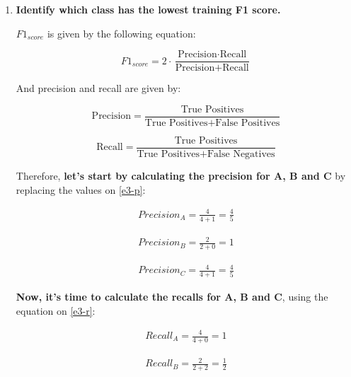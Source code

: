 \documentclass[12pt]{article}
\begin{document}
\begin{enumerate}[leftmargin=\labelsep]
    \item \textbf{Identify which class has the lowest training F1 score.}

    \vskip 0.3cm

    \(F1_{score}\) is given by the following equation:

    \begin{equation}\label{ex3-f1}
        F1_{score} = 2 \cdot \frac{{\text{Precision} \cdot \text{Recall}}}{{\text{Precision} + \text{Recall}}}
    \end{equation}

    And precision and recall are given by:

    \begin{equation}\label{e3-p}
        \text{Precision} = \frac{\text{True Positives}}{{\text{True Positives} + \text{False Positives}}}
    \end{equation}

    \begin{equation}\label{e3-r}
        \text{Recall} = \frac{\text{True Positives}}{{\text{True Positives} + \text{False Negatives}}}
    \end{equation}

    Therefore, \textbf{let's start by calculating the precision for A, B and C} by replacing the values on \eqref{e3-p}:

    \[
        \begin{aligned}
            Precision_A = \frac{4}{4+1} = \frac{4}{5}
        \end{aligned}
    \]

    \[
        \begin{aligned}
            Precision_B = \frac{2}{2+0} = 1
        \end{aligned}
    \]

    \[
        \begin{aligned}
            Precision_C = \frac{4}{4+1} = \frac{4}{5}
        \end{aligned}
    \]


    \textbf{Now, it's time to calculate the recalls for A, B and C}, using the equation on \eqref{e3-r}:

    \[
        \begin{aligned}
            Recall_A = \frac{4}{4+0} = 1
        \end{aligned}
    \]

    \[
        \begin{aligned}
            Recall_B = \frac{2}{2+2} = \frac{1}{2}
        \end{aligned}
    \]


\end{enumerate}
\end{document}
